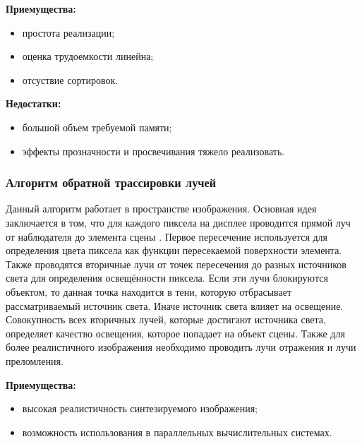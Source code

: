 \textbf{Приемущества:}
\begin{itemize}
	\item простота реализации;
	\item оценка трудоемкости линейна;
	\item отсуствие сортировок.
\end{itemize}

\textbf{Недостатки:}
\begin{itemize}
	\item большой объем требуемой памяти;
	\item эффекты прозначности и просвечивания тяжело реализовать.
\end{itemize}

\subsubsection{Алгоритм обратной трассировки лучей}

Данный алгоритм работает в пространстве изображения.
Основная идея заключается в том, что для каждого пиксела на дисплее проводится прямой луч от наблюдателя до элемента сцены \cite{roders}.
Первое пересечение используется для определения цвета пиксела как функции пересекаемой поверхности элемента.
Также проводятся вторичные лучи от точек пересечения до разных источников света для определения освещённости пиксела.
Если эти лучи блокируются объектом, то данная точка находится в тени, которую отбрасывает рассматриваемый источник света.
Иначе источник света влияет на освещение.
Совокупность всех вторичных лучей, которые достигают источника света, определяет качество освещения, которое попадает на объект сцены.
Также для более реалистичного изображения необходимо проводить лучи отражения и лучи преломления.

\textbf{Приемущества:}
\begin{itemize}
	\item высокая реалистичность синтезируемого изображения;
	\item возможность использования в параллельных вычислительных системах.
\end{itemize}

